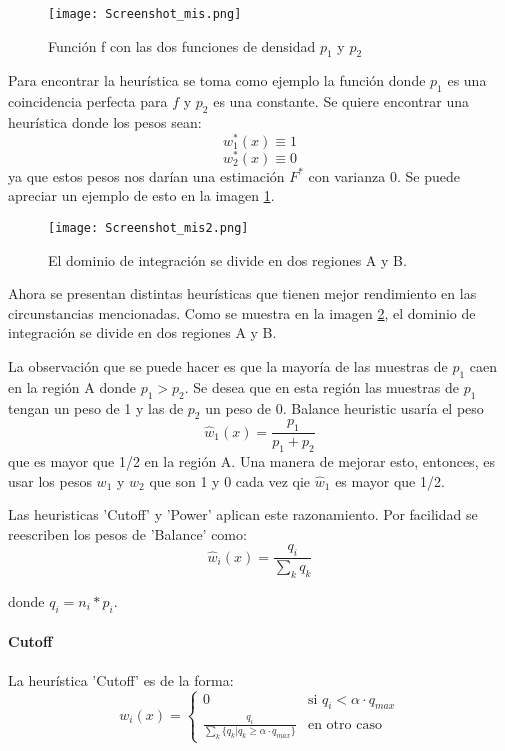 \documentclass{article}
\begin{document}
\begin{figure}[H]
\centering
\texttt{[image: Screenshot\_mis.png]}
\caption{Función f con las dos funciones de densidad $p_{1}$ y $p_{2}$}
\label{fig:misother}
\end{figure}

Para encontrar la heurística se toma como ejemplo la función donde $p_{1}$ es una coincidencia perfecta para $f$ y $p_{2}$ es una constante.
Se quiere encontrar una heurística donde los pesos sean:
$$w^{*}_{1}(x) \equiv 1$$
$$w^{*}_{2}(x) \equiv 0$$
ya que estos pesos nos darían una estimación $F^{*}$ con varianza 0.
Se puede apreciar un ejemplo de esto en la imagen \ref{fig:misother}.

\begin{figure}[H]
\centering
\texttt{[image: Screenshot\_mis2.png]}
\caption{El dominio de integración se divide en dos regiones A y B.}
\label{fig:misother2}
\end{figure}

Ahora se presentan distintas heurísticas que tienen mejor rendimiento en las circunstancias mencionadas.
Como se muestra en la imagen \ref{fig:misother2}, el dominio de integración se divide en dos regiones A y B.

La observación que se puede hacer es que la mayoría de las muestras de $p_{1}$ caen en la región A donde $p_{1} > p_{2}$.
Se desea que en esta región las muestras de $p_{1}$ tengan un peso de 1 y las de $p_{2}$ un peso de 0.
Balance heuristic usaría el peso
$$ \hat{w}_{1}(x) = \frac{p_1}{p_1 + p_2} $$
que es mayor que 1/2 en la región A. Una manera de mejorar esto, entonces, es usar los pesos $w_{1}$ y $w_{2}$ que son 1 y 0 cada vez qie $\hat{w}_{1}$ es mayor que 1/2.

Las heuristicas 'Cutoff' y 'Power' aplican este razonamiento.
Por facilidad se reescriben los pesos de 'Balance' como:
$$ \hat{w}_{i}(x) = \frac{q_{i}}{\sum_{k} q_{k}} $$

donde $q_{i} = n_{i} * p_{i}$.

\paragraph{Cutoff} La heurística 'Cutoff' es de la forma:
$$ w_{i}(x) = \begin{cases} 0 & \text{si } q_{i} < \alpha \cdot q_{max} \\ \frac{q_{i}}{\sum_{k} \{ q_{k} | q_{k} \geq \alpha \cdot q_{max} \}} & \text{en otro caso} \end{cases}$$
\end{document}
